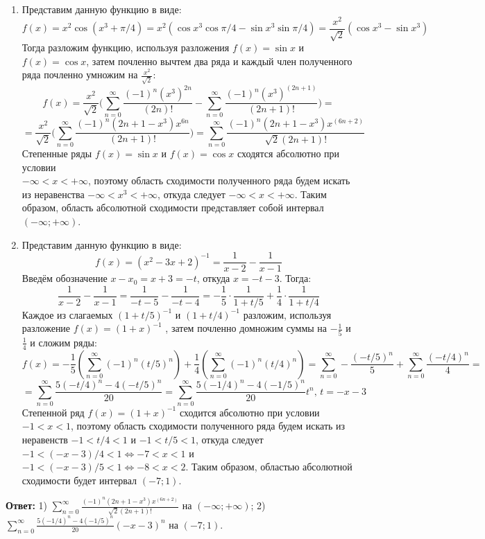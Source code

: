 \documentclass[12pt]{article}
\begin{document}
	\begin{enumerate}[wide, labelwidth=!, labelindent=0pt]
		\item Представим данную функцию в виде:
		$$ f(x) = x^2 \cos{(x^3 + \pi / 4)} = x^2(\cos{x^3}\cos{\pi/4} - \sin{x^3}\sin{\pi/4}) = \frac{x^2}{\sqrt{2}}(\cos{x^3} - \sin{x^3}) $$	
		Тогда разложим функцию, используя разложения $ f(x) = \sin{x} $ и $ f(x) = \cos{x} $, затем почленно вычтем два ряда и каждый член полученного ряда почленно умножим на $ \frac{x^2}{\sqrt{2}} $:
		$$ f(x) = \frac{x^2}{\sqrt{2}} \Big(\sum_{n=0}^\infty \frac{(-1)^n (x^3)^{2n}}{(2n)!} - \sum_{n=0}^\infty \frac{(-1)^n (x^3)^{(2n+1)}}{(2n+1)!} \Big) = $$
		$$ = \frac{x^2}{\sqrt{2}} \Big(\sum_{n=0}^\infty \frac{(-1)^n (2n + 1 - x^3) x^{6n} }{(2n + 1)!} \Big) = \sum_{n=0}^\infty \frac{(-1)^n (2n + 1 - x^3) x^{(6n + 2)} }{\sqrt{2}(2n + 1)!} $$
		Степенные ряды $ f(x) = \sin{x} $ и $ f(x) = \cos{x} $ сходятся абсолютно при условии\\ $ - \infty < x < + \infty  $, поэтому область сходимости полученного ряда будем искать из неравенства $ - \infty < x^3 < + \infty  $, откуда следует $ - \infty < x < + \infty  $. Таким образом, область абсолютной сходимости представляет собой интервал $ (- \infty;+ \infty) $.
		\item Представим данную функцию в виде:
		$$ f(x) = (x^2 - 3x + 2)^{-1} = \frac{1}{x-2} - \frac{1}{x-1} $$
		Введём обозначение $ x - x_0 = x + 3 = -t $, откуда $ x = - t - 3 $. Тогда:
		$$ \frac{1}{x-2} - \frac{1}{x-1} = \frac{1}{- t - 5} - \frac{1}{- t - 4} = -\frac{1}{5} \cdot \frac{1}{1 + t/5} + \frac{1}{4} \cdot \frac{1}{1 + t/4} $$
		Каждое из слагаемых $ (1 + t/5)^{-1} $ и $ (1 + t/4)^{-1} $ разложим, используя разложение $ f(x) = (1 + x)^{-1} $ , затем почленно домножим суммы на $ -\frac{1}{5} $ и $ \frac{1}{4} $ и сложим ряды:
		$$ f(x) = -\frac{1}{5} (\sum_{n=0}^\infty (-1)^n (t/5)^n ) + \frac{1}{4} (\sum_{n=0}^\infty (-1)^n (t/4)^n ) = \sum_{n=0}^\infty - \frac{(-t/5)^n }{5} + \sum_{n=0}^\infty \frac{(-t/4)^n }{4} = $$
		$$ = \sum_{n=0}^\infty \frac{5(-t/4)^n - 4(-t/5)^n }{20} = \sum_{n=0}^\infty \frac{5(-1/4)^n - 4(-1/5)^n }{20} t^n, \, t = - x - 3 $$
		Степенной ряд $ f(x) = (1 + x)^{-1} $ сходится абсолютно при условии $ - 1 < x < 1  $, поэтому область сходимости полученного ряда будем искать из неравенств $ - 1 < t/4 < 1 $ и $ - 1 < t/5 < 1 $, откуда следует $ - 1 < (- x - 3)/4 < 1 \Leftrightarrow - 7 < x <1$ и $ - 1 < (- x - 3)/5 < 1 \Leftrightarrow - 8 < x <2$. Таким образом, областью абсолютной сходимости будет интервал $ (- 7; 1) $.		
	\end{enumerate}
	\textbf{Ответ:} 1) $ \sum_{n=0}^\infty \frac{(-1)^n (2n + 1 - x^3) x^{(6n + 2)} }{\sqrt{2}(2n + 1)!} $ на $ (- \infty;+ \infty) $; 2) $ \sum_{n=0}^\infty \frac{5(-1/4)^n - 4(-1/5)^n }{20} (- x - 3)^n $ на $ (- 7; 1) $.	
	\newpage
\end{document}
